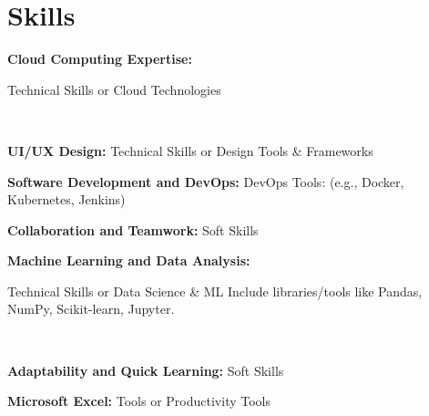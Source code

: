 \documentclass[letterpaper,11pt]{article}
\newcommand{\resumeSubHeadingListStart}{\begin{itemize}[leftmargin=0.15in, label={}]}
\newcommand{\resumeSubHeadingListEnd}{\end{itemize}}
\begin{document}
\section{Skills}
  \vspace{2pt}
  \resumeSubHeadingListStart
    \small{\item{

  
    \textbf{Cloud Computing Expertise:}{ Technical Skills or Cloud Technologies

} \ \vspace{3pt}

    \textbf{UI/UX Design:}{ Technical Skills or Design Tools & Frameworks} \ \vspace{3pt}

    \textbf{Software Development and DevOps:}{ DevOps Tools: (e.g., Docker, Kubernetes, Jenkins)} \ \vspace{3pt}

    \textbf{Collaboration and Teamwork:}{ Soft Skills} \ \vspace{3pt}

    \textbf{ Machine Learning and Data Analysis:}{ Technical Skills or Data Science & ML
Include libraries/tools like Pandas, NumPy, Scikit-learn, Jupyter.

} \ \vspace{3pt}

    \textbf{ Adaptability and Quick Learning:}{ Soft Skills} \ \vspace{3pt}

    \textbf{ Microsoft Excel:}{  Tools or Productivity Tools} \ \vspace{3pt}

}}
\resumeSubHeadingListEnd


\end{document}
